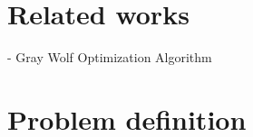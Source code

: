 \documentclass[runningheads]{llncs}
\begin{document}


\section{Related works}




- Gray Wolf Optimization Algorithm \cite{Mirjalili_Mirjalili_Lewis_2014}

\section{Problem definition}




\end{document}
